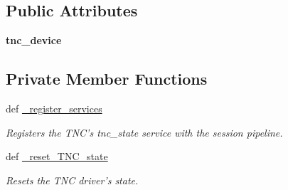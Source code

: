 \subsection*{Public Attributes}
\begin{DoxyCompactItemize}
\item 
\hypertarget{classhwm_1_1hardware_1_1devices_1_1drivers_1_1kantronics__tnc_1_1kantronics__tnc_1_1_kantronics___t_n_c_a916d48084822829a303c59b097737f22}{{\bfseries tnc\-\_\-device}}\label{classhwm_1_1hardware_1_1devices_1_1drivers_1_1kantronics__tnc_1_1kantronics__tnc_1_1_kantronics___t_n_c_a916d48084822829a303c59b097737f22}

\end{DoxyCompactItemize}
\subsection*{Private Member Functions}
\begin{DoxyCompactItemize}
\item 
def \hyperlink{classhwm_1_1hardware_1_1devices_1_1drivers_1_1kantronics__tnc_1_1kantronics__tnc_1_1_kantronics___t_n_c_a5167a44287332f51920f6475178992d5}{\-\_\-register\-\_\-services}
\begin{DoxyCompactList}\small\item\em Registers the T\-N\-C's tnc\-\_\-state service with the session pipeline. \end{DoxyCompactList}\item 
\hypertarget{classhwm_1_1hardware_1_1devices_1_1drivers_1_1kantronics__tnc_1_1kantronics__tnc_1_1_kantronics___t_n_c_a119213ec8e13f681c34ba6c34a96509d}{def \hyperlink{classhwm_1_1hardware_1_1devices_1_1drivers_1_1kantronics__tnc_1_1kantronics__tnc_1_1_kantronics___t_n_c_a119213ec8e13f681c34ba6c34a96509d}{\-\_\-reset\-\_\-\-T\-N\-C\-\_\-state}}\label{classhwm_1_1hardware_1_1devices_1_1drivers_1_1kantronics__tnc_1_1kantronics__tnc_1_1_kantronics___t_n_c_a119213ec8e13f681c34ba6c34a96509d}

\begin{DoxyCompactList}\small\item\em Resets the T\-N\-C driver's state. \end{DoxyCompactList}\end{DoxyCompactItemize}
